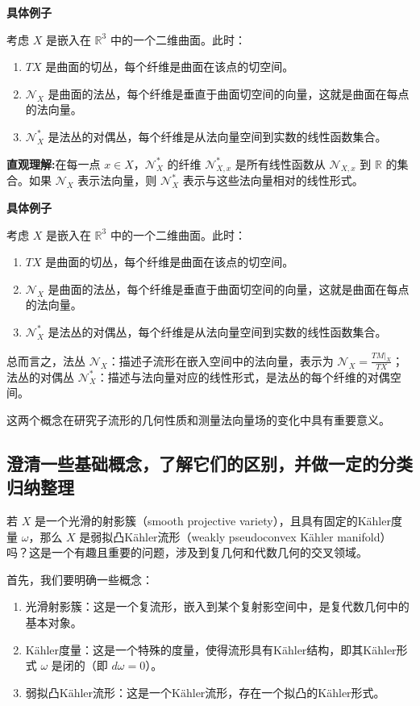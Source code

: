 \documentclass[lang=cn,12pt,a4paper,fontset=none]{beautybook}
\begin{document}
\textbf{具体例子}

考虑 \( X \) 是嵌入在 \( \mathbb{R}^3 \) 中的一个二维曲面。此时：
\begin{enumerate}
  \item \( TX \) 是曲面的切丛，每个纤维是曲面在该点的切空间。
  \item \( \mathcal{N}_X \) 是曲面的法丛，每个纤维是垂直于曲面切空间的向量，这就是曲面在每点的法向量。
  \item \( \mathcal{N}_X^* \) 是法丛的对偶丛，每个纤维是从法向量空间到实数的线性函数集合。
\end{enumerate}

\textbf{直观理解:}在每一点 \( x \in X \)，\( \mathcal{N}_X^* \) 的纤维 \( \mathcal{N}_{X,x}^* \) 是所有线性函数从 \( \mathcal{N}_{X,x} \) 到 \( \mathbb{R} \) 的集合。如果 \( \mathcal{N}_X \) 表示法向量，则 \( \mathcal{N}_X^* \) 表示与这些法向量相对的线性形式。

\textbf{具体例子}

考虑 \( X \) 是嵌入在 \( \mathbb{R}^3 \) 中的一个二维曲面。此时：
\begin{enumerate}
  \item \( TX \) 是曲面的切丛，每个纤维是曲面在该点的切空间。
  \item \( \mathcal{N}_X \) 是曲面的法丛，每个纤维是垂直于曲面切空间的向量，这就是曲面在每点的法向量。
  \item \( \mathcal{N}_X^* \) 是法丛的对偶丛，每个纤维是从法向量空间到实数的线性函数集合。
\end{enumerate}

总而言之，法丛 \( \mathcal{N}_X \)：描述子流形在嵌入空间中的法向量，表示为 \( \mathcal{N}_X = \frac{TM|_X}{TX} \)；
法丛的对偶丛 \( \mathcal{N}_X^* \)：描述与法向量对应的线性形式，是法丛的每个纤维的对偶空间。

这两个概念在研究子流形的几何性质和测量法向量场的变化中具有重要意义。


\subsection{澄清一些基础概念，了解它们的区别，并做一定的分类归纳整理}

若 \( X \) 是一个光滑的射影簇（smooth projective variety），且具有固定的Kähler度量 \(\omega\)，那么 \( X \) 是弱拟凸Kähler流形（weakly pseudoconvex Kähler manifold）吗？这是一个有趣且重要的问题，涉及到复几何和代数几何的交叉领域。

首先，我们要明确一些概念：
\begin{enumerate}
  \item 光滑射影簇：这是一个复流形，嵌入到某个复射影空间中，是复代数几何中的基本对象。
  \item Kähler度量：这是一个特殊的度量，使得流形具有Kähler结构，即其Kähler形式 \( \omega \) 是闭的（即 \( d\omega = 0 \)）。
  \item 弱拟凸Kähler流形：这是一个Kähler流形，存在一个拟凸的Kähler形式。
\end{enumerate}
\end{document}
